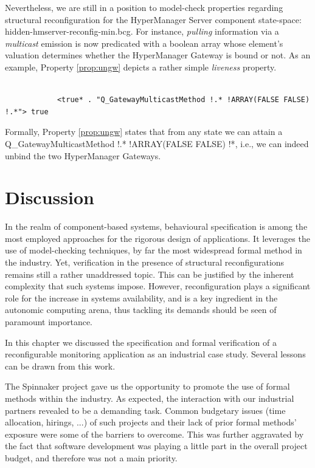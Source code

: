 	Nevertheless, we are still in a position to model-check properties regarding structural reconfiguration for the
	\textsf{HyperManager Server} component state-space: \textsf{hidden-hmserver-reconfig-min.bcg}. 
	For instance, \textit{pulling} information via a \textit{multicast} emission is now predicated with a boolean array 
	whose element's valuation determines whether the \textsf{HyperManager Gateway} is bound or not. 
	As an example, Property \ref{prop:ungw} depicts a rather simple \textit{liveness} property.
	
	\begin{property}
	\label{prop:ungw}
		\begin{verbatim}
		
			<true* . "Q_GatewayMulticastMethod !.* !ARRAY(FALSE FALSE) !.*"> true
		\end{verbatim}
	\end{property}
		  
	  
	  \noindent Formally, Property \ref{prop:ungw} states that from any state we can attain a
	  \textsf{Q\_GatewayMulticastMethod !.* !ARRAY(FALSE FALSE) !*}, i.e., we can indeed
	  unbind the two \textsf{HyperManager Gateway}s. 
	  
	  	
\section{Discussion}
\label{sec:hyperremarks}

	
		In the realm of component-based systems, behavioural specification is among 
	the most employed approaches for the rigorous design of applications. It leverages the use
	of model-checking techniques, by far the most widespread formal method in the industry. Yet,	
    verification in the presence of structural reconfigurations remains still a rather
    unaddressed topic. This can be justified by the inherent complexity that such systems impose.
    However, reconfiguration plays a significant role for the increase in systems availability, and is a key 
    ingredient in the autonomic computing arena, thus tackling its demands should be seen 
    of paramount importance.
    
		In this chapter we discussed the specification and formal verification of 
	a reconfigurable monitoring application as an industrial case study. 
	Several lessons can be drawn from this work.
	
		The Spinnaker project gave us the opportunity to promote the use of
		formal methods within the industry. As expected, the interaction with 
		our industrial partners revealed to be a demanding task. Common budgetary 
		issues (time allocation, hirings, ...) of such projects and their lack of 
		prior formal methods' exposure were some of the barriers to overcome.
		This was further aggravated by the fact that software development was playing
		a little part in the overall project budget, and therefore was not a main priority.
		
